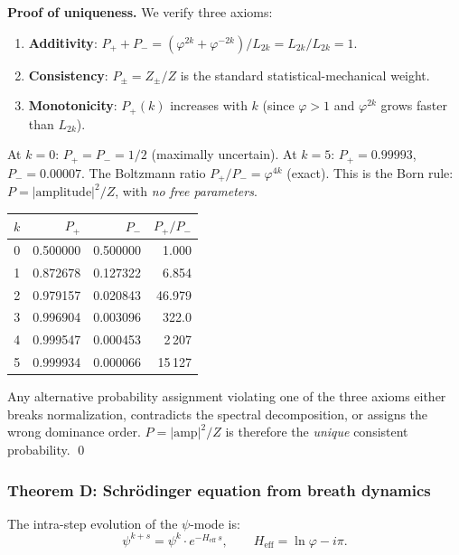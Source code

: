 \documentclass[12pt,a4paper]{article}
\begin{document}
\textbf{Proof of uniqueness.} We verify three axioms:
\begin{enumerate}[nosep]
\item \textbf{Additivity}: $P_+ + P_- = (\varphi^{2k} + \varphi^{-2k})/L_{2k} = L_{2k}/L_{2k} = 1$. \checkmark
\item \textbf{Consistency}: $P_\pm = Z_\pm / Z$ is the standard statistical-mechanical weight. \checkmark
\item \textbf{Monotonicity}: $P_+(k)$ increases with $k$ (since $\varphi > 1$ and $\varphi^{2k}$ grows faster than $L_{2k}$). \checkmark
\end{enumerate}

At $k = 0$: $P_+ = P_- = 1/2$ (maximally uncertain). At $k = 5$: $P_+ = 0.99993$, $P_- = 0.00007$. The Boltzmann ratio $P_+/P_- = \varphi^{4k}$ (exact). This is the Born rule: $P = |\mathrm{amplitude}|^2 / Z$, with \emph{no free parameters}.

\begin{center}
\small
\begin{tabular}{|c|r|r|r|}
\hline
$k$ & $P_+$ & $P_-$ & $P_+/P_-$ \\
\hline
0 & 0.500000 & 0.500000 & 1.000 \\
1 & 0.872678 & 0.127322 & 6.854 \\
2 & 0.979157 & 0.020843 & 46.979 \\
3 & 0.996904 & 0.003096 & 322.0 \\
4 & 0.999547 & 0.000453 & 2\,207 \\
5 & 0.999934 & 0.000066 & 15\,127 \\
\hline
\end{tabular}
\end{center}

Any alternative probability assignment violating one of the three axioms either breaks normalization, contradicts the spectral decomposition, or assigns the wrong dominance order. $P = |\mathrm{amp}|^2/Z$ is therefore the \emph{unique} consistent probability. \qed

\subsubsection{Theorem D: Schr\"odinger equation from breath dynamics}

The intra-step evolution of the $\psi$-mode is:
\begin{equation}
\psi^{k+s} = \psi^k \cdot e^{-H_{\mathrm{eff}} \, s}, \qquad H_{\mathrm{eff}} = \ln\varphi - i\pi.
\end{equation}
\end{document}

